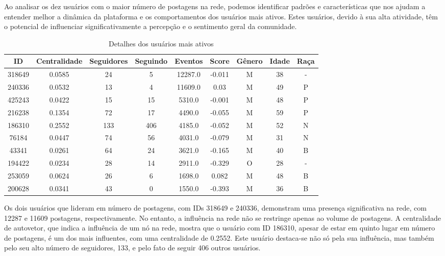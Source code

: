 Ao analisar os dez usuários com o maior número de postagens na rede, podemos identificar padrões e características que nos ajudam a entender melhor a dinâmica da plataforma e os comportamentos dos usuários mais ativos. Estes usuários, devido à sua alta atividade, têm o potencial de influenciar significativamente a percepção e o sentimento geral da comunidade.

\begin{table}[h]
	\centering
	\caption{Detalhes dos usuários mais ativos}
	\begin{tabular}{|c|c|c|c|c|c|c|c|c|}
		\hline
		ID     & Centralidade & Seguidores & Seguindo & Eventos & Score & Gênero & Idade & Raça \\
		\hline
		318649 & 0.0585          & 24         & 5        & 12287.0   & -0.011      & M      & 38    & -    \\
		\hline
		240336 & 0.0532          & 13         & 4        & 11609.0   & 0.03        & M      & 49    & P    \\
		\hline
		425243 & 0.0422          & 15         & 15       & 5310.0    & -0.001      & M      & 48    & P    \\
		\hline
		216238 & 0.1354          & 72         & 17       & 4490.0    & -0.055      & M      & 59    & P    \\
		\hline
		186310 & 0.2552          & 133        & 406      & 4185.0    & -0.052      & M      & 52    & N    \\
		\hline
		76184  & 0.0447          & 74         & 56       & 4031.0    & -0.079      & M      & 31    & N    \\
		\hline
		43341  & 0.0261          & 64         & 24       & 3621.0    & -0.165      & M      & 40    & B    \\
		\hline
		194422 & 0.0234          & 28         & 14       & 2911.0    & -0.329      & O      & 28    & -    \\
		\hline
		253059 & 0.0624          & 26         & 6        & 1698.0    & 0.082       & M      & 48    & B    \\
		\hline
		200628 & 0.0341          & 43         & 0        & 1550.0    & -0.393      & M      & 36    & B    \\
		\hline
	\end{tabular}
\end{table}

Os dois usuários que lideram em número de postagens, com IDs 318649 e 240336, demonstram uma presença significativa na rede, com 12287 e 11609 postagens, respectivamente. No entanto, a influência na rede não se restringe apenas ao volume de postagens. A centralidade de autovetor, que indica a influência de um nó na rede, mostra que o usuário com ID 186310, apesar de estar em quinto lugar em número de postagens, é um dos mais influentes, com uma centralidade de 0.2552. Este usuário destaca-se não só pela sua influência, mas também pelo seu alto número de seguidores, 133, e pelo fato de seguir 406 outros usuários.

